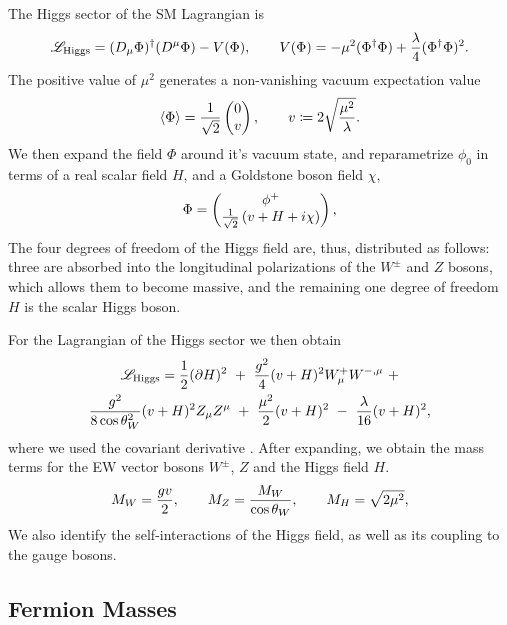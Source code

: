 The Higgs sector of the SM Lagrangian is 
\begin{equation}
{\mathscr{L}}_{\text{Higgs}} = (D_\mu\Phi)^\dagger(D^\mu\Phi)-V(\Phi), \qquad V(\Phi) = -\mu^2(\Phi^\dagger\Phi) + \frac{\lambda}{4}(\Phi^\dagger\Phi)^2.
\label{eq:LH}
\end{equation}
The positive value of $\mu^2$ generates a non-vanishing vacuum expectation value 
\begin{align}
\expval{\Phi}= \frac{1}{\sqrt{2}}\pmqty{0\\v}, \qquad v \coloneqq  2\sqrt{\frac{\mu^2}{\lambda}}.
\end{align}
We then expand the field $\Phi$ around it's vacuum state, and reparametrize $\phi_0$ in terms
of a real scalar field $H$, and a Goldstone boson field $\chi$,
\begin{align} \label{eq:Phiparam}
\Phi=\pmqty{\phi^+\\\frac{1}{\sqrt{2}}\left(v+H+i\chi\right)},
\end{align}
The four degrees of freedom of the Higgs field are, thus, distributed as follows:
three are absorbed into the longitudinal polarizations of the $W^{\pm}$ and $Z$ bosons,
which allows them to become massive,
and the remaining one degree of freedom $H$ is the scalar Higgs boson.

For the Lagrangian of the  Higgs sector we then obtain
\begin{multline}
  {\mathscr{L}}_{\text{Higgs}} 
  = \frac{1}{2}(\partial H)^2 
  ~+~\frac{g^2}{4}(v+H)^2 W^+_\mu W^{-,\mu} ~+ \\
  \frac{g^2}{8\cos \theta_W^2}(v+H)^2 Z_\mu Z^\mu
  ~+~ \frac{\mu^2}{2} (v+H)^2
  ~-~ \frac{\lambda}{16} (v+H)^2,
\end{multline}
where we used the covariant derivative .
After expanding, we obtain the mass terms for the EW vector bosons $W^\pm$, $Z$ and the Higgs field $H$.
\begin{equation}
  M_W = \frac{gv}{2}, \qquad M_Z = \frac{M_W}{\cos \theta_W}, \qquad M_H = \sqrt{2\mu^2},
\end{equation}
We also identify the self-interactions of the Higgs field, as well as its coupling to the gauge bosons.



\subsection{Fermion Masses}
\label{sec:fermmass}

